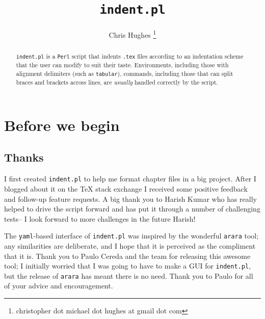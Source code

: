 


\title{\lstinline[basicstyle=\huge\ttfamily]!indent.pl!}
\author{Chris Hughes \footnote{christopher dot michael dot hughes at gmail dot com}}
\maketitle
{}
\begin{abstract}
	\lstinline!indent.pl! is a \lstinline!Perl! script that indents \lstinline!.tex!
	files according to an indentation scheme that the user can modify to suit their 
	taste. Environments, including those with alignment delimiters (such as \lstinline!tabular!), 
	commands, including those that can split braces and brackets across lines, 
	are \emph{usually} handled correctly by the script.
\end{abstract}

\tableofcontents
\lstlistoflistings

\section{Before we begin}
\subsection{Thanks}
I first created \lstinline!indent.pl! to help me format chapter files 
in a big project. After I blogged about it on the 
\TeX{} stack exchange \cite{cmhblog} I received some positive feedback and 
follow-up feature requests. A big thank you to Harish Kumar who has really 
helped to drive the script forward and has put it through a number of challenging
tests-- I look forward to more challenges in the future Harish!
 	 	 	 	 	
The \lstinline!yaml!-based interface of \lstinline!indent.pl! was inspired 
by the wonderful \lstinline!arara! tool; any similarities are deliberate, and 
I hope that it is perceived as the compliment that it is. Thank you to Paulo Cereda and the 
team for releasing this awesome tool; I initially worried that I was going to 
have to make a GUI for \lstinline!indent.pl!, but the release of \lstinline!arara! 
has meant there is no need. Thank you to Paulo for all of your advice and 
encouragement.
 	 	 	 	 	
